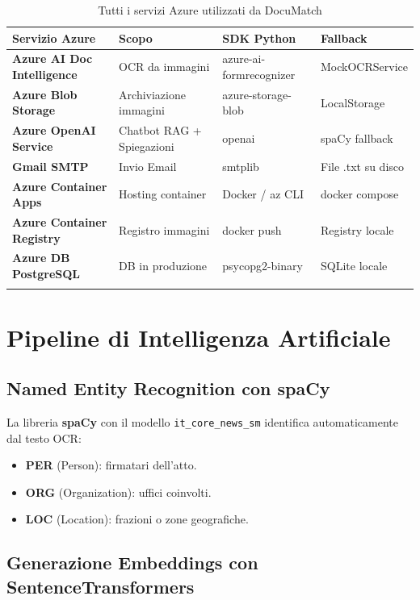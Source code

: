\documentclass[12pt,a4paper,oneside]{report}
\begin{document}
\begin{longtable}{>{\bfseries}p{3.5cm} p{3.5cm} p{2.5cm} p{2.8cm}}
    \toprule
    \textbf{Servizio Azure} & \textbf{Scopo} & \textbf{SDK Python} & \textbf{Fallback} \\
    \midrule
    \endhead
    Azure AI Doc Intelligence & OCR da immagini & azure-ai-formrecognizer & MockOCRService \\
    Azure Blob Storage & Archiviazione immagini & azure-storage-blob & LocalStorage \\
    Azure OpenAI Service & Chatbot RAG + Spiegazioni & openai & spaCy fallback \\
    Gmail SMTP & Invio Email & smtplib & File .txt su disco \\
    Azure Container Apps & Hosting container & Docker / az CLI & docker compose \\
    Azure Container Registry & Registro immagini & docker push & Registry locale \\
    Azure DB PostgreSQL & DB in produzione & psycopg2-binary & SQLite locale \\
    \bottomrule
    \caption{Tutti i servizi Azure utilizzati da DocuMatch}
\end{longtable}

\chapter{Pipeline di Intelligenza Artificiale}

\section{Named Entity Recognition con spaCy}

La libreria \textbf{spaCy} con il modello \texttt{it\_core\_news\_sm} identifica
automaticamente dal testo OCR:
\begin{itemize}
    \item \textbf{PER} (Person): firmatari dell'atto.
    \item \textbf{ORG} (Organization): uffici coinvolti.
    \item \textbf{LOC} (Location): frazioni o zone geografiche.
\end{itemize}

\section{Generazione Embeddings con SentenceTransformers}
\end{document}
